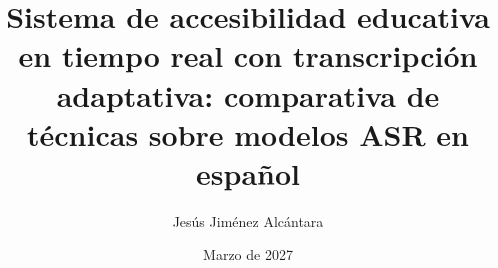 \documentclass[11pt,a4paper,spanish]{book}
\title{Sistema de accesibilidad educativa en tiempo real con transcripción adaptativa: comparativa de técnicas sobre modelos ASR en español}
\author{Jesús Jiménez Alcántara}
\date{Marzo de 2027}
\numberwithin{equation}{chapter}
\numberwithin{figure}{chapter}
\numberwithin{table}{chapter}
\begin{document}
\renewcommand{\listfigurename}{Índice de Ilustraciones}
\renewcommand{\listtablename}{Índice de Tablas}
\renewcommand{\contentsname}{Índice de Contenidos}
\renewcommand{\figurename}{Figura}
\renewcommand{\tablename}{Tabla}

\maketitle

\frontmatter
\tableofcontents
\listoffigures
\listoftables



\mainmatter










\appendix



\end{document}
